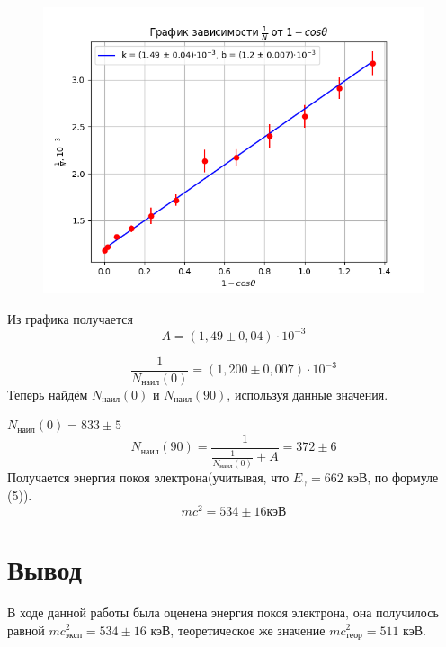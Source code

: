 \documentclass[a4paper,12pt]{article}
\begin{document}
\begin{figure}[H]
\centering
\includegraphics[scale=1]{graph.png}
\end{figure}
Из графика получается
\[A = (1,49 \pm 0,04) \cdot 10^{-3}\]

\[\frac{1}{N_\text{наил}(0)} = (1,200 \pm 0,007) \cdot 10^{-3}\]
Теперь найдём $N_\text{наил}(0)$ и $N_\text{наил}(90)$, используя данные значения.

$N_\text{наил}(0) = 833 \pm 5$
\[N_\text{наил}(90) = \frac{1}{\frac{1}{N_\text{наил}(0)} + A} = 372 \pm 6\]
Получается энергия покоя электрона(учитывая, что $E_\gamma = 662$ кэВ, по формуле (5)).
\[mc^2 = 534 \pm 16 \text{кэВ}\]

\section{Вывод}
В ходе данной работы была оценена энергия покоя электрона, она получилось равной $mc^2_\text{эксп} = 534 \pm 16$ кэВ, теоретическое же значение $mc^2_\text{теор} = 511$ кэВ.
\end{document}
